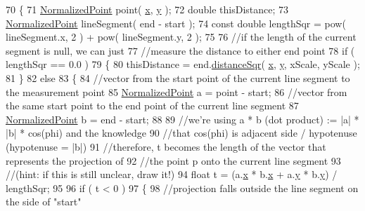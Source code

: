 \begin{DoxyCode}
70 \{
71     \hyperlink{classOkular_1_1NormalizedPoint}{NormalizedPoint} point( \hyperlink{classOkular_1_1NormalizedPoint_a857f49b9bc7712430d167472ef9dbd94}{x}, \hyperlink{classOkular_1_1NormalizedPoint_ac2276daabda627d5f82bb1532c293047}{y} );
72     \textcolor{keywordtype}{double} thisDistance;
73     \hyperlink{classOkular_1_1NormalizedPoint}{NormalizedPoint} lineSegment( end - start );
74     \textcolor{keyword}{const} \textcolor{keywordtype}{double} lengthSqr = pow( lineSegment.x, 2 ) + pow( lineSegment.y, 2 );
75 
76     \textcolor{comment}{//if the length of the current segment is null, we can just}
77     \textcolor{comment}{//measure the distance to either end point}
78     \textcolor{keywordflow}{if} ( lengthSqr == 0.0 )
79     \{
80         thisDistance = end.\hyperlink{classOkular_1_1NormalizedPoint_a7676a54a1a4c6ac5d5069cbbb09c7091}{distanceSqr}( \hyperlink{classOkular_1_1NormalizedPoint_a857f49b9bc7712430d167472ef9dbd94}{x}, \hyperlink{classOkular_1_1NormalizedPoint_ac2276daabda627d5f82bb1532c293047}{y}, xScale, yScale );
81     \}
82     \textcolor{keywordflow}{else}
83     \{
84         \textcolor{comment}{//vector from the start point of the current line segment to the measurement point}
85         \hyperlink{classOkular_1_1NormalizedPoint}{NormalizedPoint} a = point - start;
86         \textcolor{comment}{//vector from the same start point to the end point of the current line segment}
87         \hyperlink{classOkular_1_1NormalizedPoint}{NormalizedPoint} b = end - start;
88 
89         \textcolor{comment}{//we're using a * b (dot product) := |a| * |b| * cos(phi) and the knowledge}
90         \textcolor{comment}{//that cos(phi) is adjacent side / hypotenuse (hypotenuse = |b|)}
91         \textcolor{comment}{//therefore, t becomes the length of the vector that represents the projection of}
92         \textcolor{comment}{//the point p onto the current line segment}
93         \textcolor{comment}{//(hint: if this is still unclear, draw it!)}
94         \textcolor{keywordtype}{float} t = (a.\hyperlink{classOkular_1_1NormalizedPoint_a857f49b9bc7712430d167472ef9dbd94}{x} * b.\hyperlink{classOkular_1_1NormalizedPoint_a857f49b9bc7712430d167472ef9dbd94}{x} + a.\hyperlink{classOkular_1_1NormalizedPoint_ac2276daabda627d5f82bb1532c293047}{y} * b.\hyperlink{classOkular_1_1NormalizedPoint_ac2276daabda627d5f82bb1532c293047}{y}) / lengthSqr;
95 
96         \textcolor{keywordflow}{if} ( t < 0 )
97         \{
98             \textcolor{comment}{//projection falls outside the line segment on the side of "start"}

\end{DoxyCode}
